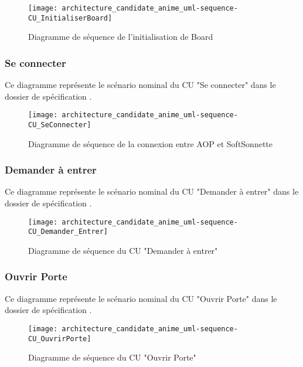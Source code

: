 \begin{figure} [H]
    \centering
    \texttt{[image: architecture\_candidate\_anime\_uml-sequence-CU\_InitialiserBoard]}
    \caption{Diagramme de séquence de l'initialisation de Board}
    \label{CU-InitialiserBoard}
\end{figure}

\newpage

\subsubsection{Se connecter} %
Ce diagramme représente le scénario nominal du CU "Se connecter" dans le dossier de spécification .\\

\begin{figure} [H]
    \centering
    \texttt{[image: architecture\_candidate\_anime\_uml-sequence-CU\_SeConnecter]}
    \caption{Diagramme de séquence de la connexion entre AOP et SoftSonnette}
    \label{CU-SeConnecter}
\end{figure}

\subsubsection{Demander à entrer} %
Ce diagramme représente le scénario nominal du CU "Demander à entrer" dans le dossier de spécification .\\

\begin{figure} [H]
    \centering
    \texttt{[image: architecture\_candidate\_anime\_uml-sequence-CU\_Demander\_Entrer]}
    \caption{Diagramme de séquence du CU "Demander à entrer" }
    \label{CU-Entrer}
\end{figure}

\subsubsection{Ouvrir Porte} %
Ce diagramme représente le scénario nominal du CU "Ouvrir Porte" dans le dossier de spécification .\\

\begin{figure} [H]
    \centering
    \texttt{[image: architecture\_candidate\_anime\_uml-sequence-CU\_OuvrirPorte]}
    \caption{Diagramme de séquence du CU "Ouvrir Porte"}
    \label{CU-OuvrirPorte}
\end{figure}

